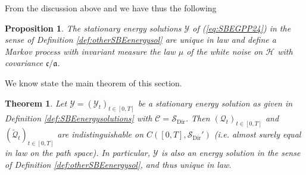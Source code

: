 \documentclass[a4paper, reqno, 12pt]{amsart}
\theoremstyle{plain}
\newtheorem{theorem}[definition]{Theorem}
\newtheorem{prop}[definition]{Proposition}
\theoremstyle{definition}
\newcommand{\Sdir}{\mathcal{S}_{\text{Dir}}}
\begin{document}
From the discussion above and \cite[Theorem 2.4]{GPP24} we have thus the following 
\begin{prop}
\label{prop:uniqueSBE}
The stationary energy solutions $\mathcal Y$ of (\ref{eq:SBEGPP24}) in the sense of Definition \ref{def:otherSBEenergysol} are unique in law and define a Markov process with invariant measure the law $\mu$ of the white noise on $\mathcal H$ with covariance $\mathfrak c / \mathfrak a$.
\end{prop}
We know state the main theorem of this section.

\begin{theorem} \label{thm:B=Q}
    Let $\mathcal Y =(\mathcal{Y}_t)_{t\in[ 0,T]}$ be a stationary energy solution as given in Definition \ref{def:SBEenergysolutions}  with $\mathcal C=\Sdir$. Then $(\mathcal Q_t)_{t\in [0,T]}$ and $(\tilde{\mathcal Q}_t)_{t\in[0,T]}$ are indistinguishable on $C([0,T],\Sdir')$ (i.e. almost surely equal in law on the path space). 
    In particular, $\mathcal Y$ is also an energy solution in the sense of Definition \ref{def:otherSBEenergysol}, and thus unique in law.
\end{theorem}
\end{document}
